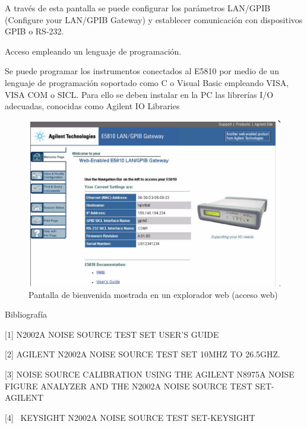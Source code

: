 A través de esta pantalla se puede configurar los parámetros LAN/GPIB (Configure your LAN/GPIB Gateway) y establecer comunicación con dispositivos GPIB o RS-232.

Acceso empleando un lenguaje de programación.

Se puede programar los instrumentos conectados al E5810 por medio de un lenguaje de programación soportado como C o Visual Basic empleando VISA, VISA COM o SICL. Para ello se deben instalar en la PC las librerías I/O adecuadas,	conocidas como Agilent IO Libraries		

\begin{figure}
	\centering
	\begin{minipage}{11.03cm}
		\includegraphics{Imagenes/PantallaBienvenidaE5810.png}
		\caption{Pantalla de bienvenida mostrada en un explorador web (acceso web)}			
		\label{Fig:PantallaBienvenidaE5810}
	\end{minipage}
\end{figure}


Bibliografía

[1] N2002A NOISE SOURCE TEST SET USER'S GUIDE

[2] AGILENT N2002A NOISE SOURCE TEST SET 10MHZ TO 26.5GHZ.

[3] NOISE SOURCE CALIBRATION USING THE AGILENT N8975A NOISE FIGURE ANALYZER AND THE N2002A NOISE SOURCE TEST SET-AGILENT

[4] \ KEYSIGHT N2002A NOISE SOURCE TEST SET-KEYSIGHT	
